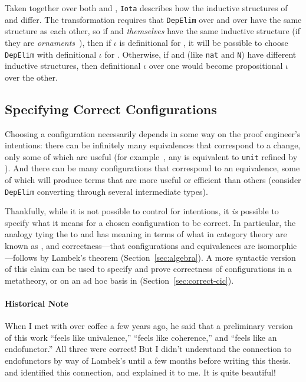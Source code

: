 Taken together over both \Aa and \B, \lstinline{Iota} describes how the inductive structures of \Aa and \B differ.
The transformation requires that \lstinline{DepElim} over \Aa and over \B have the same structure
as each other, so if \Aa and \B \textit{themselves} have the same 
inductive structure (if they are \textit{ornaments}~\cite{mcbride}),
then if $\iota$ is definitional for \Aa, it will be possible to choose
\lstinline{DepElim} with definitional $\iota$ for \B.
Otherwise, if \Aa and \B (like \lstinline{nat} and \lstinline{N}) have different inductive structures,
then definitional $\iota$ over one would become propositional $\iota$ over the other.

\subsection{Specifying Correct Configurations}
\label{sec:art}

Choosing a configuration necessarily depends in some way on the proof engineer's intentions:
there can be infinitely many equivalences that correspond to a 
change, only some of which are useful (for example~\href{https://github.com/uwplse/pumpkin-pi/blob/v2.0.0/plugin/coq/playground/refine_unit.v}{}, any \Aa is equivalent to \lstinline{unit} refined by \Aa). %
And there can be many configurations that correspond
to an equivalence, some of which will produce terms that are more useful or efficient than others
(consider \lstinline{DepElim} converting through several intermediate types).

Thankfully, while it is not possible to control for intentions,
it \textit{is} possible to specify what it means for a chosen configuration to be correct.
In particular, the analogy tying the  to  and 
has meaning in terms of what in category theory are known as ,
and correctness---that configurations and equivalences are isomorphic---follows by Lambek's 
theorem (Section~\ref{sec:algebra}).
A more syntactic version of this claim can be used to specify and prove correctness of configurations in a  metatheory,
or on an ad hoc basis in  (Section~\ref{sec:correct-cic}).

\paragraph{Historical Note}
When I met with  over coffee a few years ago, he said that a preliminary version of this work ``feels like univalence,'' ``feels like coherence,'' and ``feels like an endofunctor.'' All three were correct! But I didn't understand the connection to endofunctors by way of Lambek's until a few months before writing this thesis.
 and  identified this connection, and  explained it to me.
It is quite beautiful!

